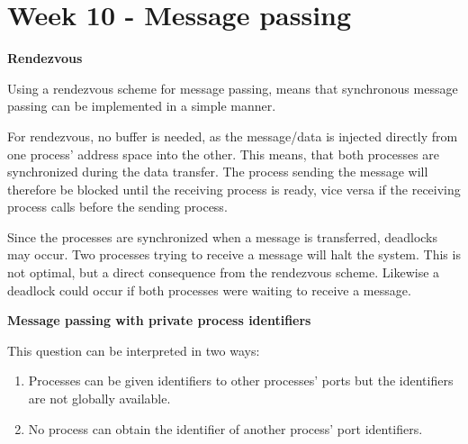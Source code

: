 \section{Week 10 - Message passing}



    
    

\textbf{Rendezvous}

Using a rendezvous scheme for message passing, means that synchronous message passing can be implemented in a simple manner. 

For rendezvous, no buffer is needed, as the message/data is injected directly from one process' address space into the other. This means, that both processes are synchronized during the data transfer. The process sending the message will therefore be blocked until the receiving process is ready, vice versa if the receiving process calls before the sending process.

Since the processes are synchronized when a message is transferred, deadlocks may occur. Two processes trying to receive a message will halt the system. This is not optimal, but a direct consequence from the rendezvous scheme. Likewise a deadlock could occur if both processes were waiting to receive a message.


\textbf{Message passing with private process identifiers}

This question can be interpreted in two ways:
\begin{enumerate}
    \item Processes can be given identifiers to other processes' ports but the identifiers are not globally available.
    \item No process can obtain the identifier of another process' port identifiers.
\end{enumerate}

